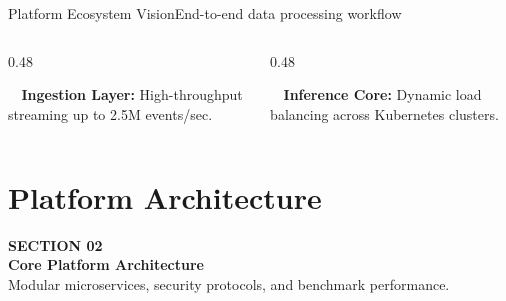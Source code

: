 \documentclass[aspectratio=169, 10pt]{beamer}
\begin{document}
\begin{frame}[label=architecture]{Platform Ecosystem Vision}{End-to-end data processing workflow}
  \vspace*{0.15cm}
  \begin{columns}[T]
    \begin{column}{0.48\textwidth}
      \begin{tcolorbox}[colback=white,colframe=BorderGray,arc=3pt,top=2pt,bottom=2pt,left=4pt,right=4pt]
        \tiny\textbf{\faCheckCircle~\color{TealAccent} Ingestion Layer:} High-throughput streaming up to 2.5M events/sec.
      \end{tcolorbox}
    \end{column}
    \begin{column}{0.48\textwidth}
      \begin{tcolorbox}[colback=white,colframe=BorderGray,arc=3pt,top=2pt,bottom=2pt,left=4pt,right=4pt]
        \tiny\textbf{\faCheckCircle~\color{RoyalAccent} Inference Core:} Dynamic load balancing across Kubernetes clusters.
      \end{tcolorbox}
    \end{column}
  \end{columns}
\end{frame}

\section{Platform Architecture}
\label{sec:architecture}

\begin{frame}
  \vfill
  \begin{tcolorbox}[
    enhanced,
    colback=NavyDark,
    colframe=TealAccent,
    boxrule=2pt,
    arc=6pt,
    top=14pt, bottom=14pt, left=14pt
  ]
    {\large\color{SkyAccent}\bfseries SECTION 02}\\[4pt]
    {\huge\bfseries\color{white} Core Platform Architecture}\\[6pt]
    {\small\color{PageBg!80!white} Modular microservices, security protocols, and benchmark performance.}
  \end{tcolorbox}
  \vfill
\end{frame}

\end{document}
